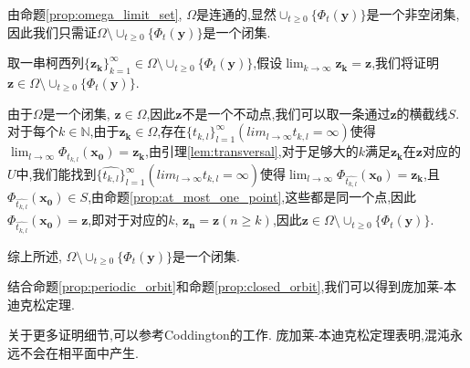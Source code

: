 \begin{pf}
    由命题\ref{prop:omega_limit_set}, $\Omega$是连通的,显然$\cup_{t\geq 0}\{\Phi_t(\mathbf{y})\}$是一个非空闭集,因此我们只需证$\Omega\setminus\cup_{t\geq 0}\{\Phi_t(\mathbf{y})\}$是一个闭集. 

    取一串柯西列$\{\mathbf{z_k}\}_{k=1}^{\infty}\in \Omega\setminus\cup_{t\geq 0}\{\Phi_t(\mathbf{y})\}$,假设$\lim_{k\to\infty}\mathbf{z_k}=\mathbf{z}$,我们将证明$\mathbf{z}\in \Omega\setminus\cup_{t\geq 0}\{\Phi_t(\mathbf{y})\}$. 

    由于$\Omega$是一个闭集, $\mathbf{z}\in \Omega$,因此$\mathbf{z}$不是一个不动点,我们可以取一条通过$\mathbf{z}$的横截线$S$. 对于每个$k\in\mathbb{N}$,由于$\mathbf{z_k}\in\Omega$,存在$\{t_{k,l}\}_{l=1}^{\infty}(lim_{l\to\infty}t_{k,l}=\infty)$使得$\lim_{l\to\infty}\Phi_{t_{k,l}}(\mathbf{x_0})=\mathbf{z_k}$,由引理\ref{lem:transversal},对于足够大的$k$满足$\mathbf{z_k}$在$\mathbf{z}$对应的$U$中,我们能找到$\{\hat{t_{k,l}}\}_{l=1}^{\infty}(lim_{l\to\infty}\hat{t_{k,l}}=\infty)$使得$\lim_{l\to\infty}\Phi_{\hat{t_{k,l}}}(\mathbf{x_0})=\mathbf{z_k}$,且$\Phi_{\hat{t_{k,l}}}(\mathbf{x_0})\in S$,由命题\ref{prop:at_most_one_point},这些都是同一个点,因此$\Phi_{\hat{t_{k,l}}}(\mathbf{x_0})=\mathbf{z}$,即对于对应的$k$, $\mathbf{z_n}=\mathbf{z}(n\geq k)$,因此$\mathbf{z}\in \Omega\setminus\cup_{t\geq 0}\{\Phi_t(\mathbf{y})\}$. 

    综上所述, $\Omega\setminus\cup_{t\geq 0}\{\Phi_t(\mathbf{y})\}$是一个闭集. 
\end{pf}
结合命题\ref{prop:periodic_orbit}和命题\ref{prop:closed_orbit},我们可以得到庞加莱-本迪克松定理. 

关于更多证明细节,可以参考Coddington的工作\cite{coddington1956theory}. 庞加莱-本迪克松定理表明,混沌永远不会在相平面中产生\cite{strogatz2018nonlinear}. 
